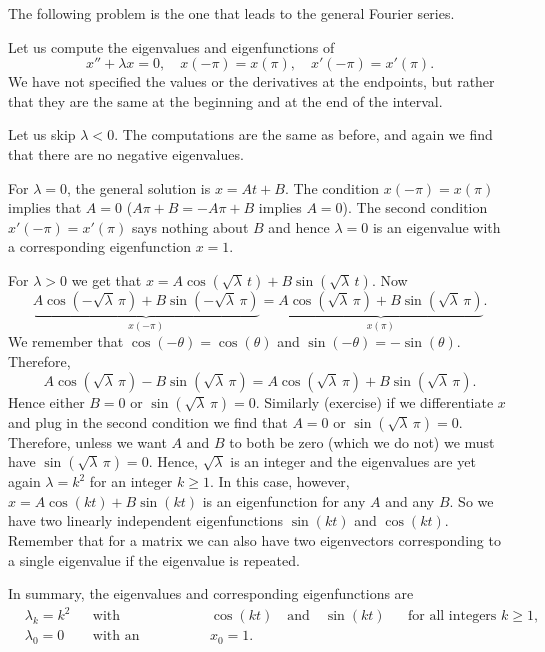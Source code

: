 \documentclass[12pt]{book}
\begin{document}
The following problem is the one that leads to the general Fourier
series.

\begin{example}
Let us compute the 
eigenvalues and eigenfunctions of
\begin{equation*}
x'' + \lambda x = 0, \quad x(-\pi) = x(\pi), \quad x'(-\pi) = x'(\pi) .
\end{equation*}
We have not specified the values or the derivatives
at the endpoints, but rather that they are the same at the beginning and
at the end of the interval.

Let us skip $\lambda < 0$.  The computations are the same as before,
and again we find
that there are no negative eigenvalues.

For $\lambda = 0$, the general solution is $x = At + B$.  The condition
$x(-\pi) = x(\pi)$ implies that $A=0$ ($A\pi + B = -A\pi +B$ implies $A=0$).
The second condition $x'(-\pi) = x'(\pi)$ says nothing about $B$ and hence
$\lambda=0$ is an eigenvalue with a corresponding eigenfunction $x=1$.

For $\lambda > 0$ we get that
$x = A \cos (\! \sqrt{\lambda}\, t ) + B \sin (\! \sqrt{\lambda}\, t)$.
Now
\begin{equation*}
\underbrace{A \cos (-\sqrt{\lambda}\, \pi) + B \sin (-\sqrt{\lambda}\,
\pi)}_{x(-\pi)}
=
\underbrace{A \cos ( \! \sqrt{\lambda}\, \pi ) + B \sin (\! \sqrt{\lambda}\,
\pi)}_{x(\pi)} .
\end{equation*}
We remember that $\cos (- \theta) = \cos (\theta)$ and
$\sin (-\theta) = - \sin (\theta)$.  Therefore,
\begin{equation*}
A \cos (\!\sqrt{\lambda}\, \pi) - B \sin (\! \sqrt{\lambda}\, \pi)
=
A \cos (\!\sqrt{\lambda}\, \pi) + B \sin (\! \sqrt{\lambda}\, \pi).
\end{equation*}
Hence either $B=0$ or $\sin (\! \sqrt{\lambda}\, \pi) = 0$.
Similarly (exercise) if we differentiate $x$ and plug in the second
condition we find that $A=0$ or $\sin (\! \sqrt{\lambda}\, \pi) = 0$.
Therefore, unless we want $A$ and $B$ to both be zero (which we do not)
we must have $\sin (\! \sqrt{\lambda}\, \pi ) = 0$.  Hence, $\sqrt{\lambda}$
is an integer and the eigenvalues are yet again $\lambda = k^2$ for
an integer $k \geq 1$.  In this case, however, 
$x = A \cos (k t) + B \sin (k t)$ is an eigenfunction for any $A$ and any $B$.
So we have two linearly independent eigenfunctions $\sin (kt)$ and $\cos (kt)$.
Remember that for a matrix we can also have two eigenvectors
corresponding to a single eigenvalue if the eigenvalue is repeated.

In summary, the eigenvalues and corresponding eigenfunctions are
\begin{align*}
& \lambda_k = k^2 & & \text{with eigenfunctions} & &
\cos (k t) \quad \text{and}\quad  \sin (k t)
 & & \text{for all integers } k \geq 1 , \\
& \lambda_0 = 0 & & \text{with an eigenfunction} & & x_0 = 1.
\end{align*}
\end{example}
\end{document}
